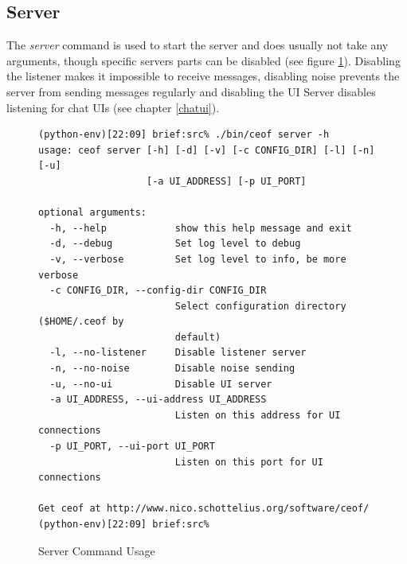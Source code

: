 \subsection{Server}
The \textit{server} command is used to start
the server and does usually not take any arguments,
though specific servers parts can be disabled
(see figure \ref{serverusage}). Disabling the listener
makes it impossible to receive messages, disabling
noise prevents the server from sending messages regularly
and disabling the UI Server disables listening for chat
UIs (see chapter \ref{chatui}).
\begin{figure}[htbp][htb]
\caption{Server Command Usage}
\label{serverusage}
\begin{verbatim}
(python-env)[22:09] brief:src% ./bin/ceof server -h
usage: ceof server [-h] [-d] [-v] [-c CONFIG_DIR] [-l] [-n] [-u]
                   [-a UI_ADDRESS] [-p UI_PORT]

optional arguments:
  -h, --help            show this help message and exit
  -d, --debug           Set log level to debug
  -v, --verbose         Set log level to info, be more verbose
  -c CONFIG_DIR, --config-dir CONFIG_DIR
                        Select configuration directory ($HOME/.ceof by
                        default)
  -l, --no-listener     Disable listener server
  -n, --no-noise        Disable noise sending
  -u, --no-ui           Disable UI server
  -a UI_ADDRESS, --ui-address UI_ADDRESS
                        Listen on this address for UI connections
  -p UI_PORT, --ui-port UI_PORT
                        Listen on this port for UI connections

Get ceof at http://www.nico.schottelius.org/software/ceof/
(python-env)[22:09] brief:src% 
\end{verbatim}
\end{figure}
